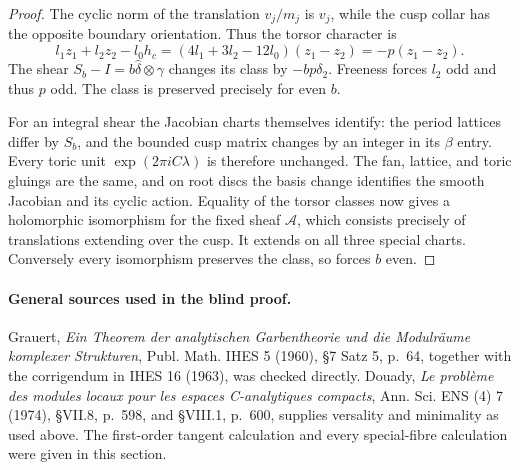 \begin{proof}
The cyclic norm of the translation $v_j/m_j$ is $v_j$, while the cusp
collar has the opposite boundary orientation.  Thus the torsor
character is
\[
 l_1z_1+l_2z_2-l_0h_c
 =(4l_1+3l_2-12l_0)(z_1-z_2)=-p(z_1-z_2).
\]
The shear $S_b-I=b\widehat\delta\otimes\gamma$ changes its class by
$-bp\delta_2$.  Freeness forces $l_2$ odd and thus $p$ odd.  The class
is preserved precisely for even $b$.

For an integral shear the Jacobian charts themselves identify: the
period lattices differ by $S_b$, and the bounded cusp matrix changes by
an integer in its $\beta$ entry.  Every toric unit
$\exp(2\pi iC\lambda)$ is therefore unchanged.  The fan, lattice, and
toric gluings are the same, and on root discs the basis change
identifies the smooth Jacobian and its cyclic action.  Equality of the
torsor classes now gives a holomorphic isomorphism for the fixed sheaf
$\mathcal A$, which consists precisely of translations extending over
the cusp.  It extends on all three special charts.  Conversely every
isomorphism preserves the class, so forces $b$ even.
\end{proof}

\paragraph{General sources used in the blind proof.}
Grauert, \emph{Ein Theorem der analytischen Garbentheorie und die
Modulräume komplexer Strukturen}, Publ. Math. IHES 5 (1960), \S7
Satz 5, p.~64, together with the corrigendum in IHES 16 (1963), was
checked directly.  Douady, \emph{Le problème des modules locaux pour
les espaces C-analytiques compacts}, Ann. Sci. ENS (4) 7 (1974),
\S VII.8, p.~598, and \S VIII.1, p.~600, supplies versality and
minimality as used above.  The first-order tangent calculation and every
special-fibre calculation were given in this section.
